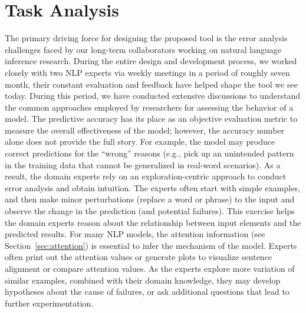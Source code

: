 \section{Task Analysis}
\label{sec:task}
The primary driving force for designing the proposed tool is the error analysis challenges faced by our long-term collaborators working on natural language inference research. During the entire design and development process, we worked closely with two NLP experts via weekly meetings in a period of roughly seven month, their constant evaluation and feedback have helped shape the tool we see today.
During this period, we have conducted extensive discussions to understand the common approaches employed by researchers for assessing the behavior of a model.
The predictive accuracy has its place as an objective evaluation metric to measure the overall effectiveness of the model; however, the accuracy number alone does not provide the full story.
For example, the model may produce correct predictions for the ``wrong'' reasons (e.g., pick up an unintended pattern in the training data that cannot be generalized in real-word scenarios).
%
As a result, the domain experts rely on an exploration-centric approach to conduct error analysis and obtain intuition.
The experts often start with simple examples, and then make minor perturbations (replace a word or phrase) to the input and observe the change in the prediction (and potential failures). This exercise helps the domain experts reason about the relationship between input elements and the predicted results. 
For many NLP models, the attention information (see Section~\ref{sec:attention}) is essential to infer the mechanism of the model. Experts often print out the attention values or generate plots to visualize sentence alignment or compare attention values. As the experts explore more variation of similar examples, combined with their domain knowledge, they may develop hypotheses about the cause of failures, or ask additional questions that lead to further experimentation.

